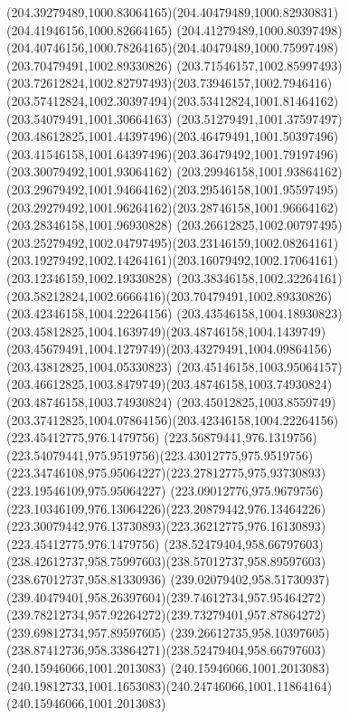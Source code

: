 {    \curveto(204.39279489,1000.83064165)(204.40479489,1000.82930831)(204.41946156,1000.82664165)
    \curveto(204.41279489,1000.80397498)(204.40746156,1000.78264165)(204.40479489,1000.75997498)
    \moveto(203.70479491,1002.89330826)
    \curveto(203.71546157,1002.85997493)(203.72612824,1002.82797493)(203.73946157,1002.7946416)
    \curveto(203.57412824,1002.30397494)(203.53412824,1001.81464162)(203.54079491,1001.30664163)
    \curveto(203.51279491,1001.37597497)(203.48612825,1001.44397496)(203.46479491,1001.50397496)
    \curveto(203.41546158,1001.64397496)(203.36479492,1001.79197496)(203.30079492,1001.93064162)
    \curveto(203.29946158,1001.93864162)(203.29679492,1001.94664162)(203.29546158,1001.95597495)
    \curveto(203.29279492,1001.96264162)(203.28746158,1001.96664162)(203.28346158,1001.96930828)
    \curveto(203.26612825,1002.00797495)(203.25279492,1002.04797495)(203.23146159,1002.08264161)
    \curveto(203.19279492,1002.14264161)(203.16079492,1002.17064161)(203.12346159,1002.19330828)
    \curveto(203.38346158,1002.32264161)(203.58212824,1002.6666416)(203.70479491,1002.89330826)
    \moveto(203.42346158,1004.22264156)
    \curveto(203.43546158,1004.18930823)(203.45812825,1004.1639749)(203.48746158,1004.1439749)
    \curveto(203.45679491,1004.1279749)(203.43279491,1004.09864156)(203.43812825,1004.05330823)
    \curveto(203.45146158,1003.95064157)(203.46612825,1003.8479749)(203.48746158,1003.74930824)
    \lineto(203.48746158,1003.74930824)
    \curveto(203.45012825,1003.8559749)(203.37412825,1004.07864156)(203.42346158,1004.22264156)
    \moveto(223.45412775,976.1479756)
    \curveto(223.56879441,976.1319756)(223.54079441,975.9519756)(223.43012775,975.9519756)
    \curveto(223.34746108,975.95064227)(223.27812775,975.93730893)(223.19546109,975.95064227)
    \curveto(223.09012776,975.9679756)(223.10346109,976.13064226)(223.20879442,976.13464226)
    \curveto(223.30079442,976.13730893)(223.36212775,976.16130893)(223.45412775,976.1479756)
    \moveto(238.52479404,958.66797603)
    \curveto(238.42612737,958.75997603)(238.57012737,958.89597603)(238.67012737,958.81330936)
    \curveto(239.02079402,958.51730937)(239.40479401,958.26397604)(239.74612734,957.95464272)
    \curveto(239.78212734,957.92264272)(239.73279401,957.87864272)(239.69812734,957.89597605)
    \curveto(239.26612735,958.10397605)(238.87412736,958.33864271)(238.52479404,958.66797603)
    \moveto(240.15946066,1001.2013083)
    \lineto(240.15946066,1001.2013083)
    \curveto(240.19812733,1001.1653083)(240.24746066,1001.11864164)(240.15946066,1001.2013083)
    \closepath
}
